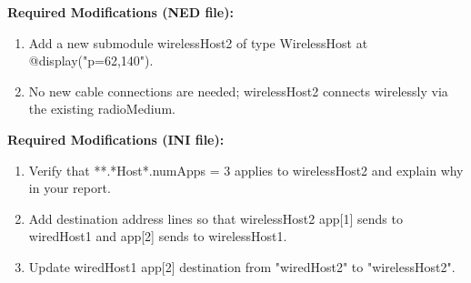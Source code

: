 \documentclass[12pt]{article}
\begin{document}
\textbf{Required Modifications (NED file):}
\begin{enumerate}
    \item Add a new submodule wirelessHost2 of type WirelessHost at @display("p=62,140").
    \item No new cable connections are needed; wirelessHost2 connects wirelessly via the existing radioMedium.
\end{enumerate}

\textbf{Required Modifications (INI file):}
\begin{enumerate}
    \item Verify that **.*Host*.numApps = 3 applies to wirelessHost2 and explain why in your report.
    \item Add destination address lines so that wirelessHost2 app[1] sends to wiredHost1 and app[2] sends to wirelessHost1.
    \item Update wiredHost1 app[2] destination from "wiredHost2" to "wirelessHost2".
\end{enumerate}
\end{document}
